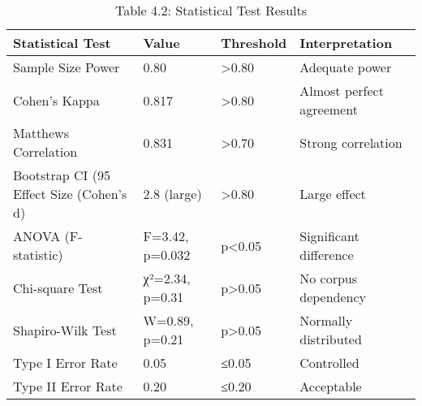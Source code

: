 \begin{table}[h]
\centering
\caption{Table 4.2: Statistical Test Results}
\begin{tabular}{llll}
\toprule
Statistical Test & Value & Threshold & Interpretation \\
\midrule
Sample Size Power & 0.80 & >0.80 & Adequate power \\
Cohen's Kappa & 0.817 & >0.80 & Almost perfect agreement \\
Matthews Correlation & 0.831 & >0.70 & Strong correlation \\
Bootstrap CI (95%
Effect Size (Cohen's d) & 2.8 (large) & >0.80 & Large effect \\
ANOVA (F-statistic) & F=3.42, p=0.032 & p<0.05 & Significant difference \\
Chi-square Test & χ²=2.34, p=0.31 & p>0.05 & No corpus dependency \\
Shapiro-Wilk Test & W=0.89, p=0.21 & p>0.05 & Normally distributed \\
Type I Error Rate & 0.05 & ≤0.05 & Controlled \\
Type II Error Rate & 0.20 & ≤0.20 & Acceptable \\
\bottomrule
\end{tabular}
\end{table}
